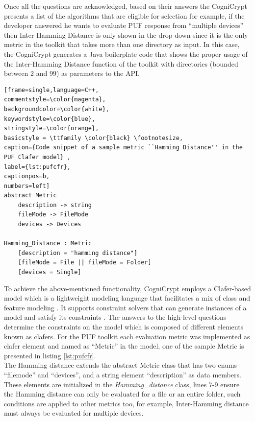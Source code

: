 Once all the questions are acknowledged, based on their answers the CogniCrypt presents a list of the algorithms that are eligible for selection for example, if the developer answered he wants to evaluate PUF response from ``multiple devices'' then Inter-Hamming Distance is only shown in the drop-down since it is the only metric in the toolkit that takes more than one directory as input. In this case, the CogniCrypt generates a Java boilerplate code that shows the proper usage of the Inter-Hamming Distance
function of the toolkit with directories (bounded between 2 and 99) as parameters to the API.\\

\begin{lstlisting}[frame=single,language=C++,
commentstyle=\color{magenta},
backgroundcolor=\color{white},
keywordstyle=\color{blue},
stringstyle=\color{orange},
basicstyle = \ttfamily \color{black} \footnotesize,
caption={Code snippet of a sample metric ``Hamming Distance'' in the PUF Clafer model} ,
label={lst:pufcfr},
captionpos=b,
numbers=left]
abstract Metric
	description -> string
	fileMode -> FileMode
	devices -> Devices

Hamming_Distance : Metric
	[description = "hamming distance"]
	[fileMode = File || fileMode = Folder]
	[devices = Single]
\end{lstlisting}

To achieve the above-mentioned functionality, CogniCrypt employs a Clafer-based model which is a lightweight modeling language that facilitates a mix of class and feature modeling \cite{clafer,cogni}. It supports constraint solvers that can generate instances of a model and satisfy its constraints \cite{cogni}. The answers to the high-level questions determine the constraints on the model which is composed of different elements known as clafers. For the PUF toolkit each evaluation metric was
implemented as clafer element and named as ``Metric'' in the model, one of the sample Metric is presented in listing \ref{lst:pufcfr}.\\

The Hamming distance extends the abstract Metric class that has two enums ``filemode'' and ``devices'', and a string element ``description'' as data members. These elements are initialized in the \emph{Hamming\_distance} class, lines 7-9 ensure the Hamming distance can only be evaluated for a file or an entire folder, such conditions are applied to other metrics too, for example, Inter-Hamming distance must always be evaluated for multiple devices.\\

